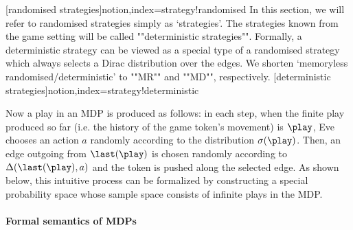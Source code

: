  [randomised strategies]{notion,index={strategy!randomised}}
%
In this section, we will refer to randomised strategies simply as `strategies'. The strategies known from the game setting will be called  ""deterministic strategies"". Formally, a deterministic strategy can be viewed as a special type of a randomised strategy which always selects a Dirac distribution over the edges. We shorten `memoryless randomised/deterministic' to ""MR"" and ""MD"", respectively.
[deterministic strategies]{notion,index={strategy!deterministic}}

Now a play in an MDP is produced as follows: in each step, when the finite play produced so far (i.e. the history of the game token's movement) is $\play$, Eve chooses an action $a$ randomly according to the distribution $\sigma(\play)$. Then, an edge outgoing from $\last(\play)$ is chosen randomly according to $\probTranFunc(\last(\play),a)$ and the token is pushed along the selected edge. As shown below, this intuitive process can be formalized by constructing a special probability space whose sample space consists of infinite plays in the MDP. 




\paragraph{Formal semantics of MDPs}

